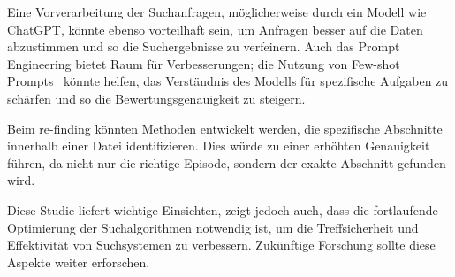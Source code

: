 Eine Vorverarbeitung der Suchanfragen, möglicherweise durch ein Modell wie ChatGPT, könnte ebenso vorteilhaft sein, um Anfragen besser auf die Daten abzustimmen und so die Suchergebnisse zu verfeinern. 
Auch das Prompt Engineering bietet Raum für Verbesserungen; die Nutzung von Few-shot Prompts~\cite{brown2020} könnte helfen, das Verständnis des Modells für spezifische Aufgaben zu schärfen und so die Bewertungsgenauigkeit zu steigern.

Beim re-finding könnten Methoden entwickelt werden, die spezifische Abschnitte innerhalb einer Datei identifizieren. 
Dies würde zu einer erhöhten Genauigkeit führen, da nicht nur die richtige Episode, sondern der exakte Abschnitt gefunden wird.

Diese Studie liefert wichtige Einsichten, zeigt jedoch auch, dass die fortlaufende Optimierung der Suchalgorithmen notwendig ist, um die Treffsicherheit und Effektivität von Suchsystemen zu verbessern. 
Zukünftige Forschung sollte diese Aspekte weiter erforschen.